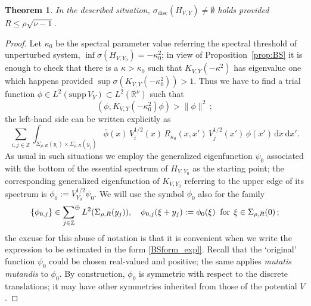 \documentclass{article}
\numberwithin{equation}{section}
\newtheorem{theorem}{Theorem}[section]
\theoremstyle{definition}
\newcommand{\D}{\mathrm{d}}
\newcommand{\R}{\mathbb{R}}
\newcommand{\Z}{\mathbb{Z}}
\newcommand{\sumoplus}{\!\raisebox{1.5ex}{{\scriptsize $\oplus$}}}
\begin{document}
\begin{theorem} \label{thm:local_pert_bs}
In the described situation, $\sigma_\mathrm{disc}(H_{V,Y})\ne\emptyset$ holds provided $R\le \rho\sqrt{\nu-1}$.
\end{theorem}
\begin{proof}
Let $\kappa_0$ be the spectral parameter value referring the spectral threshold of unperturbed system, $\inf\sigma(H_{V,Y_0})= -\kappa_0^2$; in view of Proposition~\ref{prop:BS} it is enough to check that there is a $\kappa>\kappa_0$ such that $K_{V,Y}(-\kappa^2)$ has eigenvalue one which happens provided
$\sup\sigma(K_{V,Y}(-\kappa_0^2))>1$. Thus we have to find a trial function $\phi\in L^2(\mathrm{supp}\,V_Y)\subset L^2(\R^\nu)$ such that
 \begin{equation} \label{BStrial}
(\phi, K_{V,Y}(-\kappa_0^2)\phi) > \|\phi\|^2\,;
 \end{equation}
the left-hand side can be written explicitly as
\begin{equation} \label{BSform_expl}
\sum_{i,j\in\Z} \int_{\Sigma_{\rho,R}(y_i)\times \Sigma_{\rho,R}(y_j)}  \overline\phi(x)\, V_i^{1/2}(x)\, R_{\kappa_0}(x,x')\, V_j^{1/2}(x')\,\phi(x')\,\D x\,\D x'.
\end{equation}
As usual in such situations we employ the generalized eigenfunction $\psi_0$ associated with the bottom of the essential spectrum of $H_{V,Y_0}$ as the starting point; the corresponding generalized eigenfunction of $K_{V,Y_0}$ referring to the upper edge of its spectrum is $\phi_0:=V_{Y_0}^{1/2}\psi_0$. We will use the symbol $\phi_0$ also for the family
 \begin{equation} \label{BSunmolif}
\{\phi_{0,j}\} \in \sum_{j\in\Z}\sumoplus\: L^2(\Sigma_{\rho,R}(y_j)), \quad \phi_{0,j}(\xi+y_j):=\phi_0(\xi)\;\;\text{for}\;\, \xi\in \Sigma_{\rho,R}(0)\,;
 \end{equation}
the excuse for this abuse of notation is that it is convenient when we write the expression to be estimated in the form \eqref{BSform_expl}. Recall that the `original' function $\psi_0$ could be chosen real-valued and positive; the same applies \emph{mutatis mutandis} to $\phi_0$. By construction, $\phi_0$ is symmetric with respect to the discrete translations; it may have other symmetries inherited from those of the potential $V$.


\end{proof}
\end{document}

